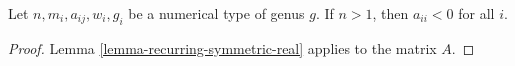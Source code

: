 \begin{lemma}
\label{lemma-diagonal-negative}
Let $n, m_i, a_{ij}, w_i, g_i$ be a numerical type of genus $g$.
If $n > 1$, then $a_{ii} < 0$ for all $i$.
\end{lemma}

\begin{proof}
Lemma \ref{lemma-recurring-symmetric-real} applies to the matrix $A$.
\end{proof}
